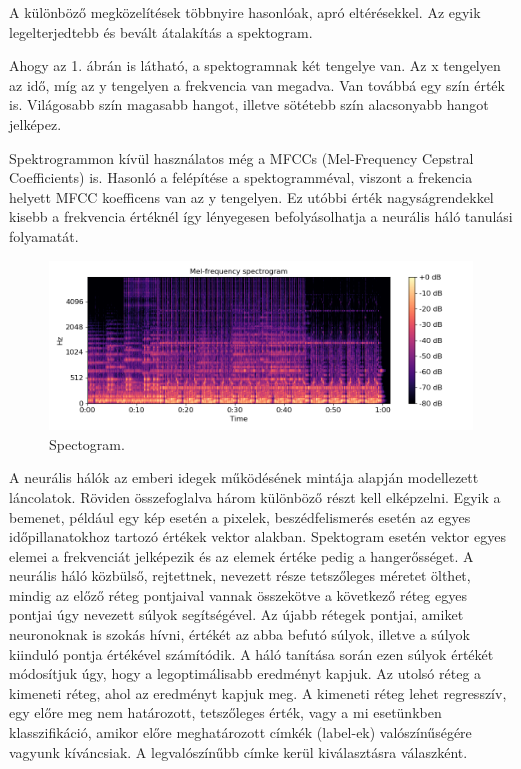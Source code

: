 A különböző megközelítések többnyire hasonlóak, apró eltérésekkel. Az egyik legelterjedtebb és bevált átalakítás a spektogram.

Ahogy az 1. ábrán is látható, a spektogramnak két tengelye van. Az x tengelyen az idő, míg az y tengelyen a frekvencia van megadva. Van továbbá egy szín érték is. Világosabb szín magasabb hangot, illetve sötétebb szín alacsonyabb hangot jelképez.

Spektrogrammon kívül használatos még a MFCCs (Mel-Frequency Cepstral Coefficients) is. Hasonló a felépítése a spektogramméval, viszont a frekencia helyett MFCC koefficens van az y tengelyen. Ez utóbbi érték nagyságrendekkel kisebb a frekvencia értéknél így lényegesen befolyásolhatja a neurális háló tanulási folyamatát.
 
\begin{figure}[!ht]
\centering
\includegraphics[width=150mm, keepaspectratio]{figures/spectogram.png}
\caption{Spectogram.}
\label{fig:TeXstudio}
\end{figure}


A neurális hálók az emberi idegek működésének mintája alapján modellezett láncolatok. Röviden összefoglalva három különböző részt kell elképzelni. Egyik a bemenet, például egy kép esetén a pixelek, beszédfelismerés esetén az egyes időpillanatokhoz tartozó értékek vektor alakban. Spektogram esetén vektor egyes elemei a frekvenciát jelképezik és az elemek értéke pedig a hangerősséget. A neurális háló közbülső, rejtettnek, nevezett része tetszőleges méretet ölthet, mindig az előző réteg pontjaival vannak összekötve a következő réteg egyes pontjai úgy nevezett súlyok segítségével. Az újabb rétegek pontjai, amiket neuronoknak is szokás hívni, értékét az abba befutó súlyok, illetve a súlyok kiinduló pontja értékével számítódik. A háló tanítása során ezen súlyok értékét módosítjuk úgy, hogy a legoptimálisabb eredményt kapjuk. Az utolsó réteg a kimeneti réteg, ahol az eredményt kapjuk meg. A kimeneti réteg lehet regresszív, egy előre meg nem határozott, tetszőleges érték, vagy a mi esetünkben klasszifikáció, amikor előre meghatározott címkék (label-ek) valószínűségére vagyunk kíváncsiak. A legvalószínűbb címke kerül kiválasztásra válaszként.

